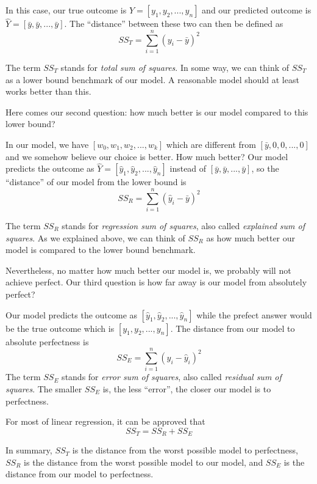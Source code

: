 \documentclass[
	letterpaper
]{article}
\begin{document}
In this case, our true outcome is $Y = [y_1, y_2, ..., y_n]$ and our predicted outcome is $\hat Y = [\bar y, \bar y, ..., \bar y]$.
The ``distance'' between these two can then be defined as 
\begin{equation}
SS_T = \sum_{i = 1}^n (y_i - \bar y) ^2 
\end{equation}

The term $SS_T$ stands for \textit{total sum of squares}.
In some way, we can think of $SS_T$ as a lower bound benchmark of our model.
A reasonable model should at least works better than this.

Here comes our second question: how much better is our model compared to this lower bound?

In our model, we have $[w_0, w_1, w_2, ..., w_k]$ which are different from $[\bar y, 0, 0, ..., 0]$ and we somehow believe our choice is better.
How much better?
Our model predicts the outcome as $\hat Y = [\hat y_1, \hat y_2, ..., \hat y_n]$ instead of $[\bar y, \bar y, ..., \bar y]$, so the ``distance'' of our model from the lower bound is 
\begin{equation}
SS_R= \sum_{i = 1}^n (\hat y_i - \bar y) ^2 
\end{equation}

The term $SS_R$ stands for \textit{regression sum of squares}, also called \textit{explained sum of squares}. As we explained above, we can think of $SS_R$ as how much better our model is compared to the lower bound benchmark.

Nevertheless, no matter how much better our model is, we probably will not achieve perfect. 
Our third question is how far away is our model from absolutely perfect?

Our model predicts the outcome as $[\hat y_1, \hat y_2, ..., \hat y_n]$ while the prefect answer would be the true outcome which is $[y_1, y_2, ..., y_n]$.
The distance from our model to absolute perfectness is 
\begin{equation}
SS_E = \sum_{i = 1}^n (y_i - \hat y_i) ^2 
\end{equation}
The term $SS_E$ stands for \textit{error sum of squares}, also called \textit{residual sum of squares}. The smaller $SS_E$ is, the less ``error'', the closer our model is to perfectness.

For most of linear regression, it can be approved that 
\begin{equation}
SS_T = SS_R + SS_E
\end{equation}

In summary, $SS_T$ is the distance from the worst possible model to perfectness, $SS_R$ is the distance from the worst possible model to our model, and $SS_E$ is the distance from our model to perfectness.
\end{document}
